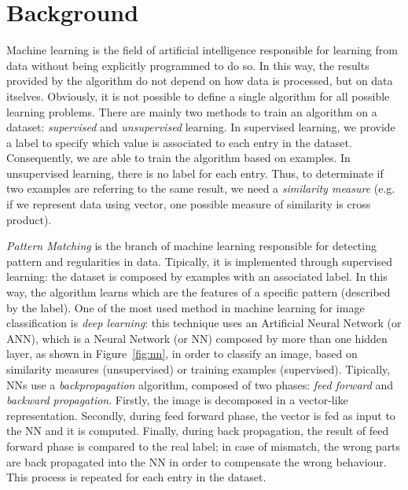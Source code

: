 \section{Background}
\label{sec:background}

Machine learning is the field of artificial intelligence responsible for learning from data without being explicitly programmed to do so. In this way, the results provided by the algorithm do not depend on how data is processed, but on data itselves. Obviously, it is not possible to define a single algorithm for all possible learning problems. There are mainly two methods to train an algorithm on a dataset: \textit{supervised} and \textit{unsupervised} learning. In supervised learning, we provide a label to specify which value is associated to each entry in the dataset. Consequently, we are able to train the algorithm based on examples. In unsupervised learning, there is no label for each entry. Thus, to determinate if two examples are referring to the same result, we need a \textit{similarity measure} (e.g. if we represent data using vector, one possible measure of similarity is cross product).

\textit{Pattern Matching} is the branch of machine learning responsible for detecting pattern and regularities in data. Tipically, it is implemented through supervised learning: the dataset is composed by examples with an associated label. In this way, the algorithm learns which are the features of a specific pattern (described by the label).
One of the most used method in machine learning for image classification is \textit{deep learning}: this technique uses an Artificial Neural Network (or ANN), which is a Neural Network (or NN) composed by more than one hidden layer, as shown in Figure~\ref{fig:nn}, in order to classify an image, based on similarity measures (unsupervised) or training examples (supervised). Tipically, NNs use a \textit{backpropagation} algorithm, composed of two phases: \textit{feed forward} and \textit{backward propagation}. Firstly, the image is decomposed in a vector-like representation. Secondly, during feed forward phase, the vector is fed as input to the NN and it is computed. Finally, during back propagation, the result of feed forward phase is compared to the real label; in case of mismatch, the wrong parts are back propagated into the NN in order to compensate the wrong behaviour. This process is repeated for each entry in the dataset.

